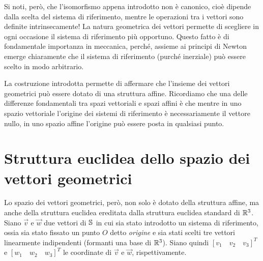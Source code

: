 \begin{figure}[h!]
\begin{center}
{\small
\begin{inaccessibleblock}[Isomorfismo.]
{}
\end{inaccessibleblock}
}
\end{center}
\end{figure}

\begin{NB}
  Si noti, però, che l'isomorfismo appena introdotto non è canonico, cioè 
dipende dalla scelta del sistema di riferimento, mentre le operazioni tra i 
vettori sono definite intrinsecamente! 
La natura geometrica dei vettori permette di scegliere in ogni occasione il 
sistema di riferimento più opportuno. 
Questo fatto è di fondamentale importanza in meccanica, perché, assieme ai 
principi di Newton emerge chiaramente che il sistema di riferimento (purché 
inerziale) può essere scelto in modo arbitrario.
\end{NB}

La costruzione introdotta permette di affermare che l'insieme dei vettori 
geometrici può 
essere dotato di una struttura affine. Ricordiamo che una delle differenze 
fondamentali
tra spazi vettoriali e spazi affini è che mentre in uno spazio vettoriale 
l'origine dei sistemi
di riferimento è necessariamente il vettore nullo, in uno spazio affine 
l'origine può
essere posta in qualsiasi punto.

\section{Struttura euclidea dello spazio dei vettori geometrici}
Lo spazio dei vettori geometrici, però, non solo è dotato della struttura 
affine, 
ma anche della struttura euclidea ereditata dalla struttura euclidea standard di
$\mathbb{R}^{3}$. Siano $\vec v$ e $\vec w$ due vettori di $\mathbb{S}^{}$ in cui sia stato 
introdotto 
un sistema di riferimento, ossia sia stato fissato un punto $O$ detto \textit{
origine} e 
sia stati scelti tre vettori linearmente indipendenti (formanti una base di 
$\mathbb{R}^{3}$).
Siano quindi $[v_1\quad v_2\quad v_3]^T$ e $[w_1\quad w_2\quad w_3]^T$ le 
coordinate
di $\vec v$ e $\vec w$, rispettivamente. 

